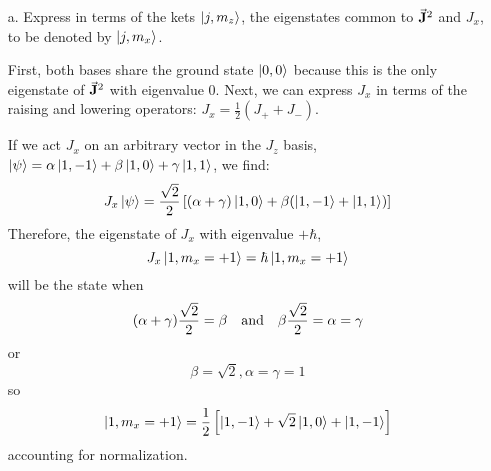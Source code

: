 \documentclass[a4paper,twoside]{article}
\begin{document}
\begin{itemize}
    \item[a.] Express in terms of the kets $\ket{j, m_z} $, the eigenstates common to $ \va{J}^2 $ and $ J_x $, to be denoted by $\ket{j, m_x} $.
        \begin{problem}
            First, both bases share the ground state $\ket{0,0} $ because this is the only eigenstate of $ \va{J}^2 $ with eigenvalue $ 0 $. Next, we can express $ J_x $ in terms of the raising and lowering operators: $ J_x = \frac{1}{2} (J_+ + J_-) $.
            
            If we act $ J_x $ on an arbitrary vector in the $ J_z $ basis, $\ket{\psi} = \alpha\ket{1,-1} + \beta\ket{1,0} + \gamma\ket{1,1} $, we find:
            \begin{equation}
                J_x\ket{\psi} = \frac{\sqrt{2}}{2} \left[ (\alpha + \gamma)\ket{1,0} + \beta (\ket{1,-1} +\ket{1,1}) \right]
            \end{equation}
            Therefore, the eigenstate of $ J_x $ with eigenvalue $ + \hbar $,
            \begin{equation}
                J_x\ket{1,m_x = +1} = \hbar\ket{1, m_x = +1}
            \end{equation}
            will be the state when
            \begin{equation}
                (\alpha + \gamma) \frac{\sqrt{2}}{2} = \beta \qand \beta \frac{\sqrt{2}}{2} = \alpha = \gamma
            \end{equation}
            or
            \begin{equation}
                \beta = \sqrt{2}, \alpha = \gamma = 1
            \end{equation}
            so
            \begin{equation}
                \ket{1, m_x = +1} = \frac{1}{2} \left[\ket{1,-1} + \sqrt{2}\ket{1,0} +\ket{1,-1}\right]
            \end{equation}
            accounting for normalization.


\end{problem}
\end{itemize}
\end{document}
